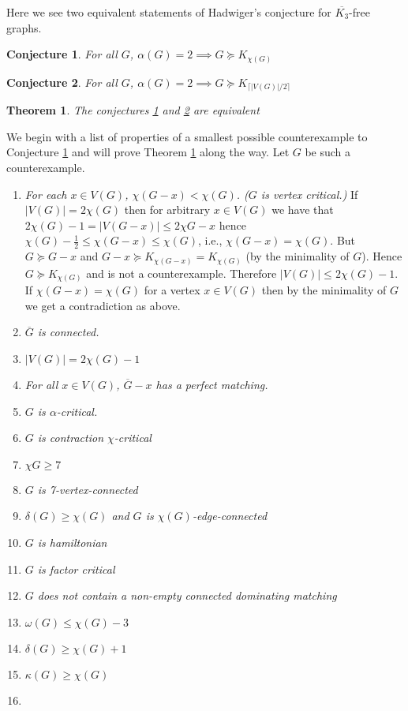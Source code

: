 \documentclass[12 pt]{article}
\newtheorem{conjecture}{Conjecture}
\newtheorem{theorem}{Theorem}
\newcommand{\kfree}{$\overline{K_3}$-free \xspace}
\begin{document}
{\begin{bibsection}[References]
\begin{biblist}[\normalsize]
Here we see two equivalent statements of Hadwiger's conjecture for \kfree graphs.
\begin{conjecture}\label{H2}
For all $G$, $\alpha(G) = 2 \implies G \succeq K_{\chi(G)}$
\end{conjecture}
\begin{conjecture}\label{H3}
For all $G$, $\alpha(G) = 2 \implies G \succeq K_{\lceil |V(G)|/2\rceil}$
\end{conjecture}
\begin{theorem}\label{H2equivH3}
The conjectures \ref{H2} and \ref{H3} are equivalent
\end{theorem}
We begin with a list of properties of a smallest possible counterexample to Conjecture \ref{H2} and will prove Theorem \ref{H2equivH3} along the way.  Let $G$ be such a counterexample.
\begin{enumerate}
	\item {\em For each $x \in V(G)$, $\chi(G-x) < \chi(G)$. ($G$ is vertex critical.)}  \newline
  If $|V(G)| = 2\chi(G)$ then for arbitrary $x \in V(G)$ we have that $2\chi(G) -1 = |V(G-x)| \leq 2\chi{G-x}$ hence $\chi(G)-\frac{1}{2} \leq \chi(G-x) \leq \chi(G)$, i.e., $\chi(G-x) = \chi(G)$.  But $G\succeq G-x$ and $G-x\succeq K_{\chi(G-x)} = K_{\chi(G)}$ (by the minimality of $G$).  Hence $G\succeq K_{\chi(G)}$ and is not a counterexample.  Therefore $|V(G)| \leq 2\chi(G)-1$. \newline 
If $\chi(G-x) = \chi(G)$ for a vertex $x\in V(G)$ then by the minimality of $G$ we get a contradiction as above.
	\item {\em $\overline{G}$ is connected.}
	\item {\em $|V(G)| = 2\chi(G) -1$}
	\item {\em For all $x \in V(G)$, $\overline{G} -x$ has a perfect matching.}
	\item {\em $G$ is $\alpha$-critical.}
	\item {\em $G$ is contraction $\chi$-critical}
	\item {\em $\chi{G} \geq 7$}
	\item {\em $G$ is 7-vertex-connected}
	\item {\em $\delta(G) \geq \chi(G)$ and $G$ is $\chi(G)$-edge-connected}
	\item {\em $G$ is hamiltonian}
	\item {\em $G$ is factor critical}
	\item {\em $G$ does not contain a non-empty connected dominating matching}
	\item {\em $\omega(G)\leq \chi(G)-3$}
	\item {\em $\delta(G) \geq \chi(G)+1$}
	\item {\em $\kappa(G) \geq \chi(G)$}
	\item {\em }


\end{enumerate}
\end{biblist}
\end{bibsection}}
\end{document}
